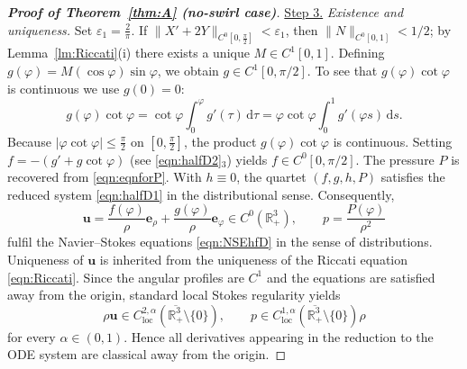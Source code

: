 \documentclass[10pt,a4paper]{amsart}
\newcommand{\Be}{{\boldsymbol{e}}}
\newcommand{\Bu}{{\boldsymbol{u}}}
\newcommand{\R}{\mathbb{R}}
\newcommand{\n}{\rho}
\newcommand{\rmd}{\mathrm{d}}
\newcommand{\vp}{\varphi}
\begin{document}
\begin{proof}[\textbf{Proof of Theorem~\ref{thm:A} (no-swirl case)}]
\noindent
\underline{Step 3.} \emph{Existence and uniqueness.}
Set $\varepsilon_1 = \frac{2}{\pi}$. If $\|X'+2Y\|_{C^0[0, \frac{\pi}{2}]} < \varepsilon_1$, then $\|N\|_{C^0[0, 1]} < 1/2$; by Lemma~\ref{lm:Riccati}(i) there exists a unique $M\in C^1[0,1]$. 
Defining $g(\vp)=M(\cos\vp)\sin\vp$, we obtain $g\in C^1[0,\pi/2]$.
To see that $g(\vp)\cot\vp$ is continuous we use $g(0)=0$:
\[
g(\vp)\cot\vp = \cot\vp \int_0^{\vp} g'(\tau)\,\rmd\tau
= \vp\cot\vp \int_0^1 g'(\vp s)\,\rmd s.
\]
Because $|\vp\cot\vp| \le \frac{\pi}{2}$ on $[0,\frac{\pi}{2}]$, the product $g(\varphi)\cot\varphi$ is continuous. Setting $f = -(g' + g\cot\varphi)$ (see \eqref{eqn:halfD2}$_3$) yields $f\in C^0[0,\pi/2]$.  The pressure $P$ is recovered from \eqref{eqn:eqnforP}.  With $h\equiv0$, the quartet $(f,g,h,P)$ satisfies the reduced system \eqref{eqn:halfD1} in the distributional sense. 
Consequently,
\[
\Bu = \frac{f(\varphi)}{\rho}\Be_\rho + \frac{g(\varphi)}{\rho}\Be_\varphi \in C^0(\R^3_+),
\qquad
p = \frac{P(\varphi)}{\rho^2}
\]
fulfil the Navier--Stokes equations \eqref{eqn:NSEhfD} in the sense of distributions.
Uniqueness of $\Bu$ is inherited from the uniqueness of the Riccati equation \eqref{eqn:Riccati}.
Since the angular profiles are $C^1$ and the equations are satisfied away from the origin, standard local Stokes regularity yields \[\n\Bu\in C^{2,\alpha}_{\mathrm{loc}}(\overline{\mathbb R^3_+}\setminus\{0\}),\qquad p\in C^{1,\alpha}_{\mathrm{loc}}(\overline{\mathbb R^3_+}\setminus\{0\})\n\] for every $\alpha\in(0,1)$. Hence all derivatives appearing in the reduction to the ODE system are classical away from the origin.
\end{proof}
\end{document}
